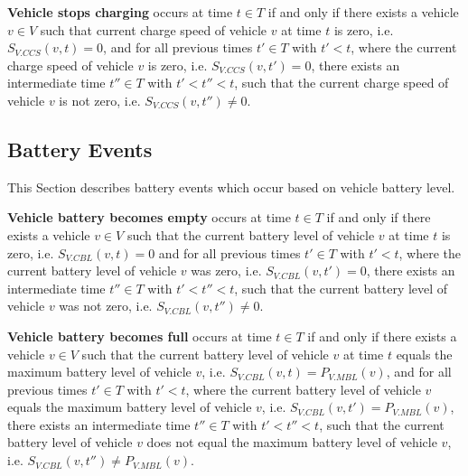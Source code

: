 \documentclass[graybox]{svmult}
\begin{document}

\vspace{4mm}
\noindent
\textbf{Vehicle stops charging}
occurs at time $t \in T$ if and only if there exists a vehicle $v \in V$ such that current charge speed of vehicle $v$ at time $t$ is zero, i.e. $S_{V.CCS}(v,t) = 0$, and for all previous times $t' \in T$ with $t' < t$, where the current charge speed of vehicle $v$ is zero, i.e. $S_{V.CCS}(v,t') = 0$, there exists an intermediate time $t'' \in T$ with $t' < t'' < t$, such that the current charge speed of vehicle $v$ is not zero, i.e. $S_{V.CCS}(v,t'') \neq 0$.

\vspace{4mm}
\noindent
\subsection{Battery Events}
\label{sec:battery-events}
This Section describes battery events which occur based on vehicle battery level.
\vspace{4mm}

\noindent
\textbf{Vehicle battery becomes empty}
occurs at time $t \in T$ if and only if there exists a vehicle $v \in V$ such that the current battery level of vehicle $v$ at time $t$ is zero, i.e. $S_{V.CBL}(v,t) = 0$ and for all previous times $t' \in T$ with $t' < t$, where the current battery level of vehicle $v$ was zero, i.e. $S_{V.CBL}(v,t') = 0$, there exists an intermediate time $t'' \in T$ with $t' < t'' < t$, such that the current battery level of vehicle $v$ was not zero, i.e. $S_{V.CBL}(v,t'') \neq 0$.

\vspace{4mm}
\noindent
\textbf{Vehicle battery becomes full}
occurs at time $t \in T$ if and only if there exists a vehicle $v \in V$ such that the current battery level of vehicle $v$ at time $t$ equals the maximum battery level of vehicle $v$, i.e. $S_{V.CBL}(v,t) = P_{V.MBL}(v)$, and for all previous times $t' \in T$ with $t' < t$, where the current battery level of vehicle $v$ equals the maximum battery level of vehicle $v$, i.e. $S_{V.CBL}(v,t') = P_{V.MBL}(v)$, there exists an intermediate time $t'' \in T$ with $t' < t'' < t$, such that the current battery level of vehicle $v$ does not equal the maximum battery level of vehicle $v$, i.e. $S_{V.CBL}(v,t'') \neq P_{V.MBL}(v)$.
\end{document}
